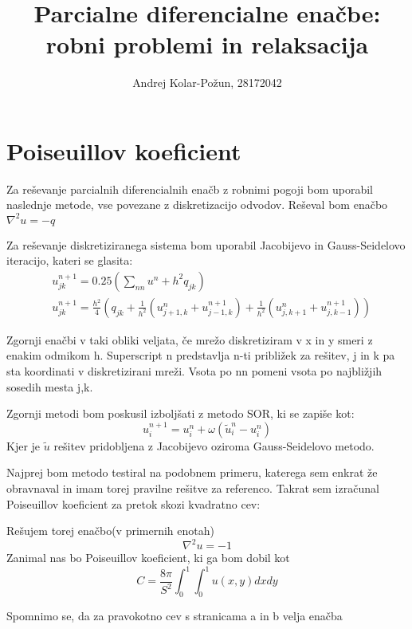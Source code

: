 \documentclass{article}
\title{Parcialne diferencialne enačbe: robni problemi in relaksacija}
\author{Andrej Kolar-Požun, 28172042}
\begin{document}
\maketitle
{}
\section{Poiseuillov koeficient}

Za reševanje parcialnih diferencialnih enačb z robnimi pogoji bom uporabil naslednje metode, vse povezane z diskretizacijo odvodov.
Reševal bom enačbo $\nabla^2 u = - q$

Za reševanje diskretiziranega sistema bom uporabil Jacobijevo in Gauss-Seidelovo iteracijo, kateri se glasita:
\begin{align*}
&u^{n+1}_{jk} = 0.25 \left( \sum_{nn} u^n + h^2 q_{jk}\right) \\ 
&u_{jk}^{n+1} = \frac{h^2}{4} \left( q_{jk} + \frac{1}{h^2} (u^{n}_{j+1,k} + u^{n+1}_{j-1,k}) + \frac{1}{h^2} (u^{n}_{j,k+1} + u^{n+1}_{j,k-1})\right)
\end{align*}

Zgornji enačbi v taki obliki veljata, če mrežo diskretiziram v x in y smeri z enakim odmikom h. Superscript n predstavlja n-ti približek za rešitev, j in k pa sta koordinati v diskretizirani mreži. Vsota po nn pomeni vsota po najbližjih sosedih mesta j,k.

Zgornji metodi bom poskusil izboljšati z metodo SOR, ki se zapiše kot:
\begin{equation*}
u_i^{n+1} = u_i^n + \omega(\tilde{u}_i^n - u_i^n)
\end{equation*}
Kjer je $\tilde{u}$ rešitev pridobljena z Jacobijevo oziroma Gauss-Seidelovo metodo.

Najprej bom metodo testiral na podobnem primeru, katerega sem enkrat že obravnaval in imam torej pravilne rešitve za referenco.
Takrat sem izračunal Poiseuillov koeficient za pretok skozi kvadratno cev:

Rešujem torej enačbo(v primernih enotah) 
\begin{equation*}
\nabla^2 u = - 1
\end{equation*}
Zanimal nas bo Poiseuillov koeficient, ki ga bom dobil kot
\begin{equation*}
C = \frac{8\pi}{S^2} \int_0^1 \int_0^1 u(x,y) dx dy
\end{equation*}

Spomnimo se, da za pravokotno cev s stranicama a in b velja enačba
\end{document}
